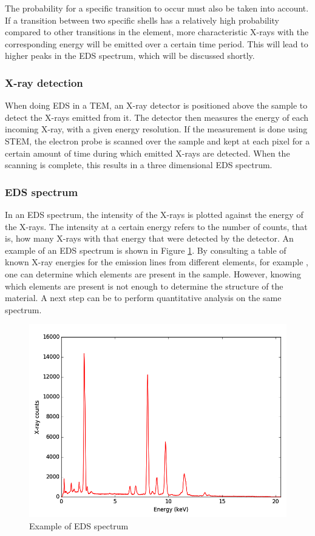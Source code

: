The probability for a specific transition to occur must also be taken into account. If a transition between two specific shells has a relatively high probability compared to other transitions in the element, more characteristic X-rays with the corresponding energy will be emitted over a certain time period. This will lead to higher peaks in the EDS spectrum, which will be discussed shortly.

		\subsubsection{X-ray detection}
When doing EDS in a TEM, an X-ray detector is positioned above the sample to detect the X-rays emitted from it. The detector then measures the energy of each incoming X-ray, with a given energy resolution. If the measurement is done using STEM, the electron probe is scanned over the sample and kept at each pixel for a certain amount of time during which emitted X-rays are detected. When the scanning is complete, this results in a three dimensional EDS spectrum.

		\subsubsection{EDS spectrum}\label{sec:eds-spec}
In an EDS spectrum, the intensity of the X-rays is plotted against the energy of the X-rays. The intensity at a certain energy refers to the number of counts, that is, how many X-rays with that energy that were detected by the detector. An example of an EDS spectrum is shown in Figure \ref{fig:eds-example-spectrum}. By consulting a table of known X-ray energies for the emission lines from different elements, for example \cite{x-ray-booklet}, one can determine which elements are present in the sample. However, knowing which elements are present is not enough to determine the structure of the material. A next step can be to perform quantitative analysis on the same spectrum.

\begin{figure}
\centering
\includegraphics[width=0.7\linewidth]{fig/edx-example-spectrum}
\caption{Example of EDS spectrum}
\label{fig:eds-example-spectrum}
\end{figure}

